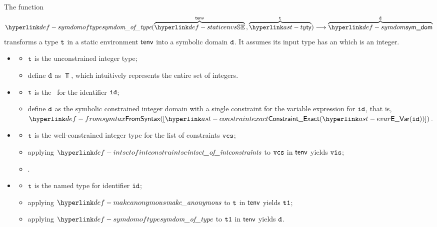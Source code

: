 \hypertarget{def-symdomoftype}{}
The function
\[
  \symdomoftype(\overname{\staticenvs}{\tenv} \aslsep \overname{\ty}{\vt}) \aslto \overname{\symdom}{\vd}
\]
transforms a type $\texttt{t}$ in a static environment $\textsf{tenv}$ into a symbolic domain $\vd$.
It assumes its input type has an \underlyingtype{} which is an integer.
\ProseParagraph
\OneApplies
\begin{itemize}
  \item {}
  \begin{itemize}
    \item $\texttt{t}$ is the unconstrained integer type;
    \item define $\vd$ as $\Top$, which intuitively represents the entire set of integers.
  \end{itemize}

  \item {}
  \begin{itemize}
    \item $\texttt{t}$ is the \parameterizedintegertype\ for the identifier $\texttt{id}$;
    \item define $\vd$ as the symbolic constrained integer domain with a single constraint for the variable expression for $\texttt{id}$,
          that is, \\ $\FromSyntax([\ConstraintExact(\EVar(\id))])$.
  \end{itemize}

  \item {}
  \begin{itemize}
    \item $\texttt{t}$ is the well-constrained integer type for the list of constraints $\texttt{vcs}$;
    \item applying $\intsetofintconstraints$ to $\texttt{vcs}$ in $\textsf{tenv}$ yields $\vis$;
    \item \Proseeqdef{$\vd$}{$\vis$}.
  \end{itemize}

  \item {}
  \begin{itemize}
    \item $\texttt{t}$ is the named type for identifier $\texttt{id}$;
    \item applying $\makeanonymous$ to $\texttt{t}$ in $\textsf{tenv}$ yields $\texttt{t1}$;
    \item applying $\symdomoftype$ to $\texttt{t1}$ in $\textsf{tenv}$ yields $\vd$.
  \end{itemize}
\end{itemize}

